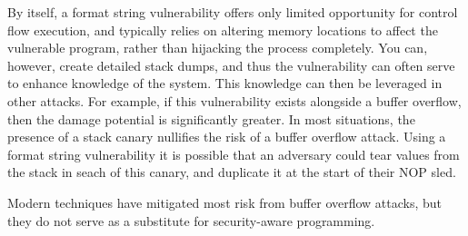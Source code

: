 By itself, a format string vulnerability offers only limited opportunity for control flow execution, and typically
relies on altering memory locations to affect the vulnerable program, rather than hijacking the process completely. You
can, however, create detailed stack dumps, and thus the vulnerability can often serve to enhance knowledge of the
system. This knowledge can then be leveraged in other attacks. For example, if this vulnerability exists alongside a
buffer overflow, then the damage potential is significantly greater. In most situations, the presence of a stack canary
nullifies the risk of a buffer overflow attack. Using a format string vulnerability it is possible that an adversary
could tear values from the stack in seach of this canary, and duplicate it at the start of their NOP sled.

Modern techniques have mitigated most risk from buffer overflow attacks, but they do not serve as a substitute for
security-aware programming.
